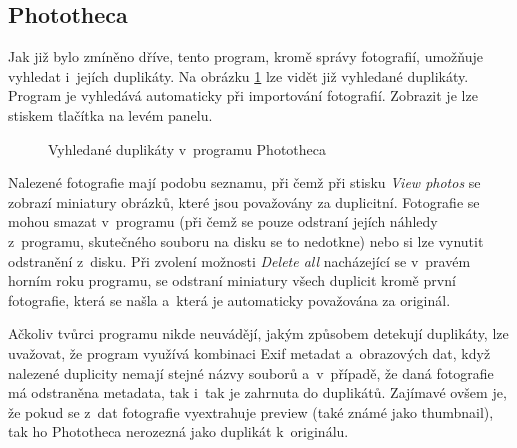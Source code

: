 \subsection*{Phototheca}

Jak již bylo zmíněno dříve, tento program, kromě správy fotografií, umožňuje vyhledat i~jejích duplikáty. Na obrázku \ref{photo_dupl} lze vidět již vyhledané duplikáty. Program je vyhledává automaticky při importování fotografií. Zobrazit je lze stiskem tlačítka na levém panelu. 

\begin{figure}[h]
\begin{center}
\caption{Vyhledané duplikáty v~programu Phototheca}
\label{photo_dupl}
\end{center}
\end{figure}

Nalezené fotografie mají podobu seznamu, při čemž při stisku \textit{View photos} se zobrazí miniatury obrázků, které jsou považovány za duplicitní. Fotografie se mohou smazat v~programu (při čemž se pouze odstraní jejích náhledy z~programu, skutečného souboru na disku se to nedotkne) nebo si lze vynutit odstranění z~disku. Při zvolení možnosti \textit{Delete all} nacházející se v~pravém horním roku programu, se odstraní miniatury všech duplicit kromě první fotografie, která se našla a~která je automaticky považována za originál.

Ačkoliv tvůrci programu nikde neuvádějí, jakým způsobem detekují duplikáty, lze uvažovat, že program využívá kombinaci Exif metadat a~obrazových dat, když nalezené duplicity nemají stejné názvy souborů a~v~případě, že daná fotografie má odstraněna metadata, tak i~tak je zahrnuta do duplikátů. Zajímavé ovšem je, že pokud se z~dat fotografie vyextrahuje preview (také známé jako thumbnail), tak ho Phototheca nerozezná jako duplikát k~originálu.

